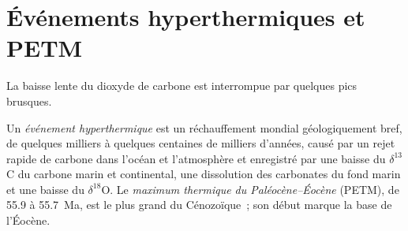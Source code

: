 \section{Événements hyperthermiques et PETM}\label{sec:b2:deep-time-climate:petm}

La baisse lente du dioxyde de carbone est interrompue par quelques pics brusques.

\begin{definition}\label{def:b2:deep-time-climate:petm}
Un \emph{événement hyperthermique} est un réchauffement mondial géologiquement bref, de
quelques milliers à quelques centaines de milliers d'années, causé par un rejet rapide de carbone dans l'océan et
l'atmosphère et enregistré par une baisse du $\delta^{13}$C du carbone marin et continental, une
dissolution des carbonates du fond marin et une baisse du $\delta^{18}$O. Le \emph{maximum thermique
du Paléocène--Éocène} (PETM), de 55.9 à \qty{55.7}{Ma}, est le
plus grand du Cénozoïque~; son début marque la base de l'Éocène.
\end{definition}

